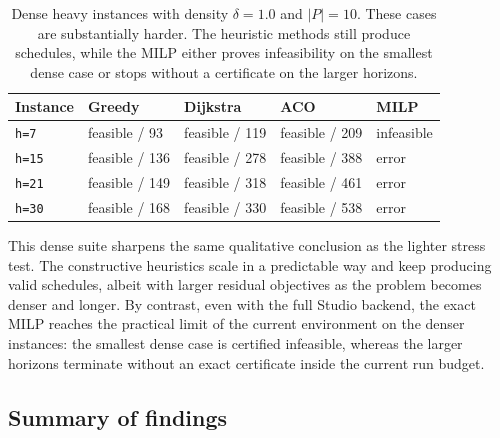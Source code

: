 \begin{table}[t]
\centering\small
\caption{Dense heavy instances with density $\delta=1.0$ and $|P|=10$.
  These cases are substantially harder.  The heuristic methods still produce
  schedules, while the MILP either proves infeasibility on the smallest dense
  case or stops without a certificate on the larger horizons.}
\label{tab:dense_heavy_suite}
\begin{tabular}{l l l l l}
\toprule
Instance & Greedy & Dijkstra & ACO & MILP \\
\midrule
\texttt{h=7}  & feasible / 93  & feasible / 119 & feasible / 209 & infeasible \\
\texttt{h=15} & feasible / 136 & feasible / 278 & feasible / 388 & error \\
\texttt{h=21} & feasible / 149 & feasible / 318 & feasible / 461 & error \\
\texttt{h=30} & feasible / 168 & feasible / 330 & feasible / 538 & error \\
\bottomrule
\end{tabular}
\end{table}

This dense suite sharpens the same qualitative conclusion as the lighter
stress test.  The constructive heuristics scale in a predictable way and keep
producing valid schedules, albeit with larger residual objectives as the
problem becomes denser and longer.  By contrast, even with the full Studio
backend, the exact MILP reaches the practical limit of the current environment
on the denser instances: the smallest dense case is certified infeasible,
whereas the larger horizons terminate without an exact certificate inside the
current run budget.

\subsection{Summary of findings}

